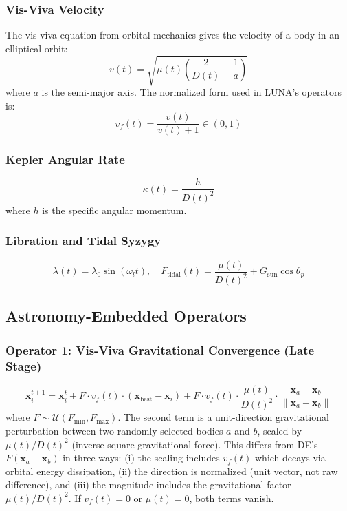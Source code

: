 \documentclass[review]{elsarticle}
\theoremstyle{definition}
\begin{document}
\subsubsection{Vis-Viva Velocity}

The vis-viva equation from orbital mechanics gives the velocity of a body in an elliptical orbit:
\begin{equation}
v(t) = \sqrt{\mu(t) \left(\frac{2}{D(t)} - \frac{1}{a}\right)}
\label{eq:visviva}
\end{equation}
where $a$ is the semi-major axis. The normalized form used in LUNA's operators is:
\begin{equation}
v_f(t) = \frac{v(t)}{v(t) + 1} \in (0, 1)
\label{eq:vf}
\end{equation}

\subsubsection{Kepler Angular Rate}
\begin{equation}
\kappa(t) = \frac{h}{D(t)^2}
\label{eq:kepler}
\end{equation}
where $h$ is the specific angular momentum.

\subsubsection{Libration and Tidal Syzygy}
\begin{equation}
\lambda(t) = \lambda_0 \sin(\omega_l t), \quad F_{\mathrm{tidal}}(t) = \frac{\mu(t)}{D(t)^2} + G_{\mathrm{sun}} \cos\theta_p
\label{eq:libration}
\end{equation}

\subsection{Astronomy-Embedded Operators}

\subsubsection{Operator 1: Vis-Viva Gravitational Convergence (Late Stage)}

\begin{equation}
\mathbf{x}_i^{t+1} = \mathbf{x}_i^t + F \cdot v_f(t) \cdot (\mathbf{x}_{\mathrm{best}} - \mathbf{x}_i) + F \cdot v_f(t) \cdot \frac{\mu(t)}{D(t)^2} \cdot \frac{\mathbf{x}_a - \mathbf{x}_b}{\|\mathbf{x}_a - \mathbf{x}_b\|}
\label{eq:op1}
\end{equation}
where $F \sim \mathcal{U}(F_{\min}, F_{\max})$. The second term is a unit-direction gravitational perturbation between two randomly selected bodies $a$ and $b$, scaled by $\mu(t)/D(t)^2$ (inverse-square gravitational force). This differs from DE's $F(\mathbf{x}_a - \mathbf{x}_b)$ in three ways: (i) the scaling includes $v_f(t)$ which decays via orbital energy dissipation, (ii) the direction is normalized (unit vector, not raw difference), and (iii) the magnitude includes the gravitational factor $\mu(t)/D(t)^2$. If $v_f(t) = 0$ or $\mu(t) = 0$, both terms vanish.
\end{document}
